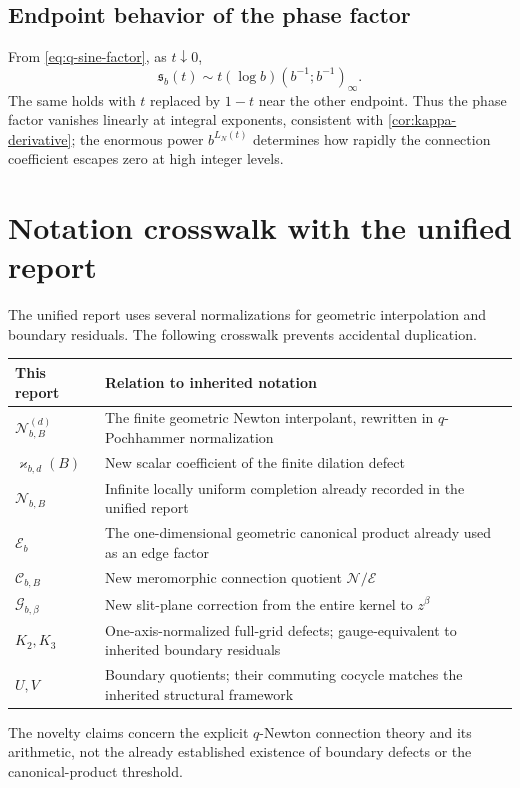 \documentclass[11pt]{article}
\theoremstyle{definition}
\newcommand{\Nker}{\mathscr{N}}
\newcommand{\Eker}{\mathscr{E}}
\newcommand{\Cker}{\mathscr{C}}
\newcommand{\Gker}{\mathscr{G}}
\newcommand{\kk}{\varkappa}
\newcommand{\qpi}[2]{\left(#1;#2\right)_{\!\infty}}
\begin{document}
\subsection{Endpoint behavior of the phase factor}

From \eqref{eq:q-sine-factor}, as $t\downarrow0$,
\[
 \mathfrak{s}_b(t)
 \sim t(\log b)\qpi{b^{-1}}{b^{-1}}.
\]
The same holds with $t$ replaced by $1-t$ near the other endpoint.  Thus the phase factor vanishes linearly at integral exponents, consistent with \cref{cor:kappa-derivative}; the enormous power $b^{L_N(t)}$ determines how rapidly the connection coefficient escapes zero at high integer levels.

\section{Notation crosswalk with the unified report}

The unified report uses several normalizations for geometric interpolation and boundary residuals.  The following crosswalk prevents accidental duplication.
\begin{center}
\begin{tabularx}{\textwidth}{@{}p{}X@{}}
\toprule
This report & Relation to inherited notation \\
\midrule
$\Nker^{(d)}_{b,B}$ & The finite geometric Newton interpolant, rewritten in $q$-Pochhammer normalization \\
$\kk_{b,d}(B)$ & New scalar coefficient of the finite dilation defect \\
$\Nker_{b,B}$ & Infinite locally uniform completion already recorded in the unified report \\
$\Eker_b$ & The one-dimensional geometric canonical product already used as an edge factor \\
$\Cker_{b,B}$ & New meromorphic connection quotient $\Nker/\Eker$ \\
$\Gker_{b,\beta}$ & New slit-plane correction from the entire kernel to $z^\beta$ \\
$K_2,K_3$ & One-axis-normalized full-grid defects; gauge-equivalent to inherited boundary residuals \\
$U,V$ & Boundary quotients; their commuting cocycle matches the inherited structural framework \\
\bottomrule
\end{tabularx}
\end{center}
The novelty claims concern the explicit $q$-Newton connection theory and its arithmetic, not the already established existence of boundary defects or the canonical-product threshold.
\end{document}
